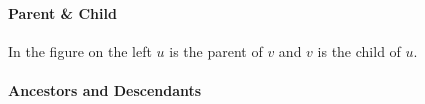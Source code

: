 \documentclass[a4paper, 10pt]{article}
\begin{document}
\paragraph{Parent \& Child}
\begin{multicols}{2}
\begin{center}
\end{center}
In the figure on the left \(u\) is the parent of \(v\) and \(v\) is the child of \(u\).
\end{multicols}
\paragraph{Ancestors and Descendants}
\end{document}
